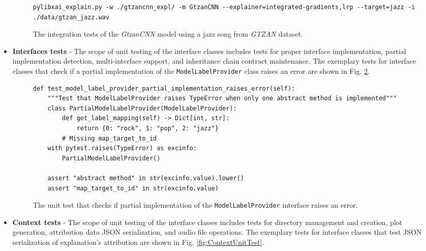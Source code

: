 \documentclass[
    bindingoffset=5mm,  %
    footnoteindent=3mm, %
    hyphenation=true    %
]{src/wut-thesis}
\begin{document}
\begin{itemize}
\begin{figure}[h]
\begin{verbatim}
pylibxai_explain.py -w ./gtzancnn_expl/ -m GtzanCNN --explainer=integrated-gradients,lrp --target=jazz -i ./data/gtzan_jazz.wav
\end{verbatim}
\caption{The integration tests of the \emph{GtzanCNN} model using a jazz song from \emph{GTZAN} dataset.}
\label{fig:ModelIntegrationTest}
\end{figure}

    \item \textbf{Interfaces tests} - The scope of unit testing of the interface classes includes tests for
        proper interface implementation, partial implementation detection, multi-interface support, and inheritance
        chain contract maintenance. The exemplary tests for interface classes that check if a partial implementation
        of the \texttt{ModelLabelProvider} class raises an error are shown in Fig. \ref{fig:InterfaceUnitTest}.

\begin{figure}[h]
\begin{verbatim}
def test_model_label_provider_partial_implementation_raises_error(self):
    """Test that ModelLabelProvider raises TypeError when only one abstract method is implemented"""
    class PartialModelLabelProvider(ModelLabelProvider):
        def get_label_mapping(self) -> Dict[int, str]:
            return {0: "rock", 1: "pop", 2: "jazz"}
        # Missing map_target_to_id
    with pytest.raises(TypeError) as excinfo:
        PartialModelLabelProvider()
    
    assert "abstract method" in str(excinfo.value).lower()
    assert "map_target_to_id" in str(excinfo.value)
\end{verbatim}
\caption{The unit test that checks if partial implementation of the \texttt{ModelLabelProvider} interface raises an error.}
\label{fig:InterfaceUnitTest}
\end{figure}

    \item \textbf{Context tests} - The scope of unit testing of the interface classes includes tests for directory
        management and creation, plot generation, attribution data JSON serialization, and audio file operations.
        The exemplary tests for interface classes that test JSON serialization of explanation’s attribution are
        shown in Fig. \ref{fig:ContextUnitTest}.


\end{itemize}
\end{document}
